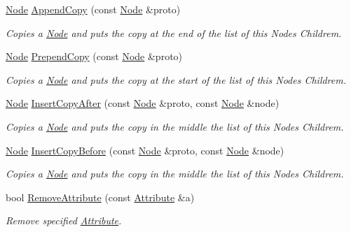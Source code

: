 \begin{DoxyCompactItemize}
\hyperlink{classphys_1_1xml_1_1Node}{Node} \hyperlink{classphys_1_1xml_1_1Node_aa187049e72e1d7c8e055ba60b4946dd3}{AppendCopy} (const \hyperlink{classphys_1_1xml_1_1Node}{Node} \&proto)
\begin{DoxyCompactList}\small\item\em Copies a \hyperlink{classphys_1_1xml_1_1Node}{Node} and puts the copy at the end of the list of this Nodes Childrem. \item\end{DoxyCompactList}\item 
\hyperlink{classphys_1_1xml_1_1Node}{Node} \hyperlink{classphys_1_1xml_1_1Node_a39b55aafd5a79bcd8dc5fdaed1a0ef10}{PrependCopy} (const \hyperlink{classphys_1_1xml_1_1Node}{Node} \&proto)
\begin{DoxyCompactList}\small\item\em Copies a \hyperlink{classphys_1_1xml_1_1Node}{Node} and puts the copy at the start of the list of this Nodes Childrem. \item\end{DoxyCompactList}\item 
\hyperlink{classphys_1_1xml_1_1Node}{Node} \hyperlink{classphys_1_1xml_1_1Node_addb6e4bcd5a5c11e1275c01209b841ec}{InsertCopyAfter} (const \hyperlink{classphys_1_1xml_1_1Node}{Node} \&proto, const \hyperlink{classphys_1_1xml_1_1Node}{Node} \&node)
\begin{DoxyCompactList}\small\item\em Copies a \hyperlink{classphys_1_1xml_1_1Node}{Node} and puts the copy in the middle the list of this Nodes Childrem. \item\end{DoxyCompactList}\item 
\hyperlink{classphys_1_1xml_1_1Node}{Node} \hyperlink{classphys_1_1xml_1_1Node_a14076565b03bb093d3a8ebf919f5fc6c}{InsertCopyBefore} (const \hyperlink{classphys_1_1xml_1_1Node}{Node} \&proto, const \hyperlink{classphys_1_1xml_1_1Node}{Node} \&node)
\begin{DoxyCompactList}\small\item\em Copies a \hyperlink{classphys_1_1xml_1_1Node}{Node} and puts the copy in the middle the list of this Nodes Childrem. \item\end{DoxyCompactList}\item 
bool \hyperlink{classphys_1_1xml_1_1Node_a9a0bec16ad12b7e0f7ed4cfd7c05a1f4}{RemoveAttribute} (const \hyperlink{classphys_1_1xml_1_1Attribute}{Attribute} \&a)
\begin{DoxyCompactList}\small\item\em Remove specified \hyperlink{classphys_1_1xml_1_1Attribute}{Attribute}. \item\end{DoxyCompactList}\item 

\end{DoxyCompactItemize}
